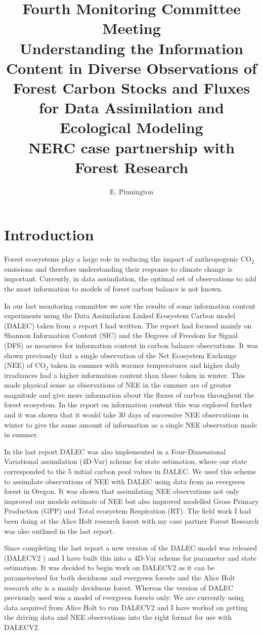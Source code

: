 \documentclass[11pt]{article}
\title{Fourth Monitoring Committee Meeting\\\vspace{4mm} \normalsize{Understanding the Information Content in Diverse Observations of Forest Carbon Stocks and Fluxes for Data Assimilation and Ecological Modeling\\ NERC case partnership with Forest Research}}
\author{\normalsize{E. Pinnington}}
\begin{document}
\maketitle

\section{Introduction}

Forest ecosystems play a large role in reducing the impact of anthropogenic CO$_2$ emissions and therefore understanding their response to climate change is important. Currently, in data assimilation, the optimal set of observations to add the most information to models of forest carbon balance is not known.  

In our last monitoring committee we saw the results of some information content experiments using the Data Assimilation Linked Ecosystem Carbon model (DALEC) \citep{williams2005improved} taken from a report I had written. The report had focused mainly on Shannon Information Content (SIC) and the Degrees of Freedom for Signal (DFS) \citep{rodgers2000inverse} as measures for information content in carbon balance observations. It was shown previously that a single observation of the Net Ecosystem Exchange (NEE) of CO$_2$ taken in summer with warmer temperatures and higher daily irradiances had a higher information content than those taken in winter. This made physical sense as observations of NEE in the summer are of greater magnitude and give more information about the fluxes of carbon throughout the forest ecosystem. In the report on information content this was explored further and it was shown that it would take 30 days of successive NEE observations in winter to give the same amount of information as a single NEE observation made in summer.

In the last report DALEC was also implemented in a Four-Dimensional Variational assimilation (4D-Var) scheme for state estimation, where our state corresponded to the 5 initial carbon pool values in DALEC. We used this scheme to assimilate observations of NEE with DALEC using data from an evergreen forest in Oregon. It was shown that assimilating NEE observations not only improved our models estimate of NEE but also improved modelled Gross Primary Production (GPP) and Total ecosystem Respiration (RT). The field work I had been doing at the Alice Holt research forest with my case partner Forest Research was also outlined in the last report.

Since completing the last report a new version of the DALEC model was released (DALECV2 \citep{Bloom2014}) and I have built this into a 4D-Var scheme for parameter and state estimation. It was decided to begin work on DALECV2 as it can be parameterised for both deciduous and evergreen forests and the Alice Holt research site is a mainly deciduous forest. Whereas the version of DALEC previously used was a model of  evergreen forests only. We are currently using data acquired from Alice Holt to run DALECV2 and I have worked on getting the driving data and NEE observations into the right format for use with DALECV2.
\end{document}
